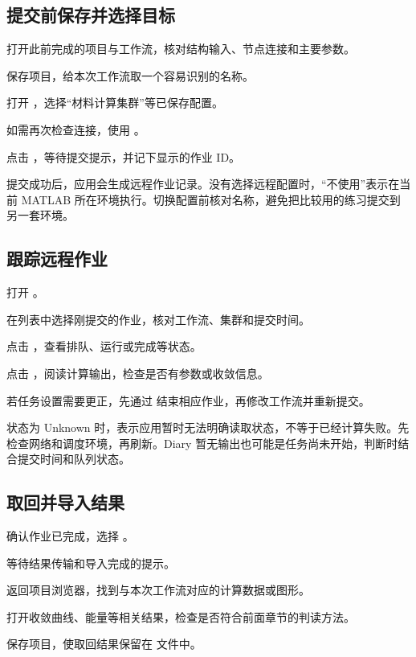 \subsection{提交前保存并选择目标}

\begin{steps}
\item 打开此前完成的项目与工作流，核对结构输入、节点连接和主要参数。
\item 保存项目，给本次工作流取一个容易识别的名称。
\item 打开 ，选择“材料计算集群”等已保存配置。
\item 如需再次检查连接，使用 。
\item 点击 ，等待提交提示，并记下显示的作业 ID。
\end{steps}

提交成功后，应用会生成远程作业记录。没有选择远程配置时，“不使用”表示在当前 MATLAB\regmark{} 所在环境执行。切换配置前核对名称，避免把比较用的练习提交到另一套环境。

\subsection{跟踪远程作业}

\begin{steps}
\item 打开 。
\item 在列表中选择刚提交的作业，核对工作流、集群和提交时间。
\item 点击 ，查看排队、运行或完成等状态。
\item 点击 ，阅读计算输出，检查是否有参数或收敛信息。
\item 若任务设置需要更正，先通过  结束相应作业，再修改工作流并重新提交。
\end{steps}

状态为 Unknown 时，表示应用暂时无法明确读取状态，不等于已经计算失败。先检查网络和调度环境，再刷新。Diary 暂无输出也可能是任务尚未开始，判断时结合提交时间和队列状态。


\subsection{取回并导入结果}

\begin{steps}
\item 确认作业已完成，选择 。
\item 等待结果传输和导入完成的提示。
\item 返回项目浏览器，找到与本次工作流对应的计算数据或图形。
\item 打开收敛曲线、能量等相关结果，检查是否符合前面章节的判读方法。
\item 保存项目，使取回结果保留在  文件中。
\end{steps}

